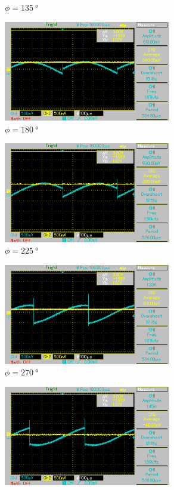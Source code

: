 \begin{figure}
\begin{subfigure}{0.5\textwidth}
    \caption{$\phi = \qty[]{135}{\degree}$}%
    \end{subfigure}%
    \hfill
    \begin{subfigure}{0.5\textwidth}%
    \centering%
    \includegraphics[width = 7.3cm]{./Oszilloskop Bilder/png/5.3/nt5.png}%
    \caption{$\phi = \qty[]{180}{\degree}$}%
    \end{subfigure}%
    \hfill
    \begin{subfigure}{0.5\textwidth}%
    \centering%
    \includegraphics[width = 7.3cm]{./Oszilloskop Bilder/png/5.3/nt6.png}%
    \caption{$\phi = \qty[]{225}{\degree}$}%
    \end{subfigure}%
    \hfill
    \begin{subfigure}{0.5\textwidth}%
    \centering%
    \includegraphics[width = 7.3cm]{./Oszilloskop Bilder/png/5.3/nt7.png}%
    \caption{$\phi = \qty[]{270}{\degree}$}%
    \end{subfigure}%
    \hfill
    \begin{subfigure}{0.5\textwidth}%
    \centering%
    \includegraphics[width = 7.3cm]{./Oszilloskop Bilder/png/5.3/nt8.png}%

\end{subfigure}
\end{figure}
